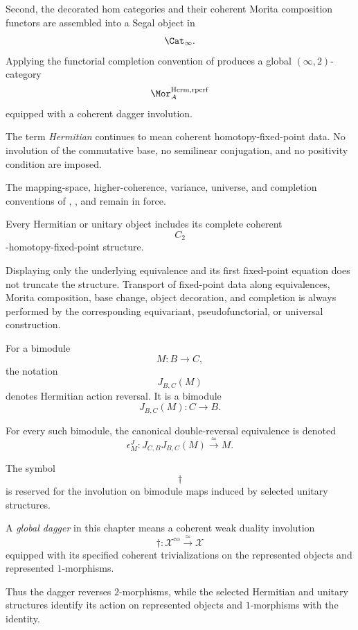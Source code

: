 Second, the decorated hom categories and their coherent Morita
composition functors are assembled into a Segal object in
\[
    \Cat_\infty.
\]
Applying the functorial completion convention of
produces a global $(\infty,2)$-category
\[
    \Mor_A^{\mathrm{Herm,rperf}}
\]
equipped with a coherent dagger involution.

The term \emph{Hermitian} continues to mean coherent
homotopy-fixed-point data. No involution of the commutative base, no
semilinear conjugation, and no positivity condition are imposed.

The mapping-space, higher-coherence, variance, universe, and completion
conventions of
,
,
and
remain in force.

\begin{convention}
\label{conv:hermitian-morita-fixed-points}
Every Hermitian or unitary object includes its complete coherent
\[
    C_2
\]
-homotopy-fixed-point structure.

Displaying only the underlying equivalence and its first fixed-point
equation does not truncate the structure. Transport of fixed-point data
along equivalences, Morita composition, base change, object decoration,
and completion is always performed by the corresponding equivariant,
pseudofunctorial, or universal construction.
\end{convention}

\begin{convention}
\label{conv:hermitian-reversal-dagger-notation}
For a bimodule
\[
    M\colon B\longrightarrow C,
\]
the notation
\[
    J_{B,C}(M)
\]
denotes Hermitian action reversal. It is a bimodule
\[
    J_{B,C}(M)\colon C\longrightarrow B.
\]

For every such bimodule, the canonical double-reversal equivalence is
denoted
\[
    \epsilon^J_M
    \colon
    J_{C,B}J_{B,C}(M)
    \xrightarrow{\;\simeq\;}
    M.
\]

The symbol
\[
    \dagger
\]
is reserved for the involution on bimodule maps induced by selected
unitary structures.
\end{convention}

\begin{convention}
\label{conv:global-dagger-meaning}
A \emph{global dagger} in this chapter means a coherent weak duality
involution
\[
    \dagger
    \colon
    \mathcal X^{\mathrm{co}}
    \xrightarrow{\;\simeq\;}
    \mathcal X
\]
equipped with its specified coherent trivializations on the represented
objects and represented $1$-morphisms.

Thus the dagger reverses $2$-morphisms, while the selected Hermitian and
unitary structures identify its action on represented objects and
$1$-morphisms with the identity.
\end{convention}

